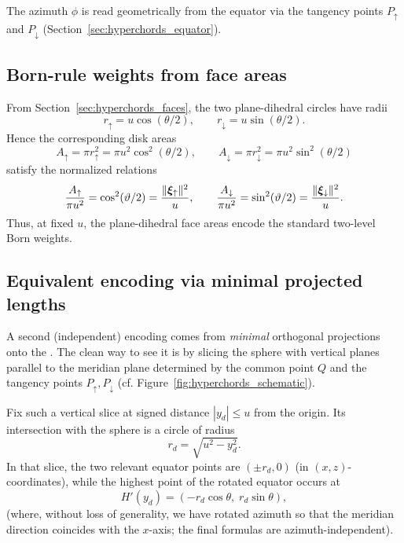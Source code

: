 The azimuth \(\phi\) is read geometrically from the equator via the tangency points \(P_\uparrow\) and \(P_\downarrow\) (Section~\ref{sec:hyperchords_equator}).

\subsection{Born-rule weights from face areas}
\label{sec:reading_probabilities}

From Section~\ref{sec:hyperchords_faces}, the two plane-dihedral circles have radii
\[
r_\uparrow=u\cos(\theta/2),
\qquad
r_\downarrow=u\sin(\theta/2).
\]
Hence the corresponding disk areas
\[
A_\uparrow=\pi r_\uparrow^2=\pi u^2\cos^2(\theta/2),
\qquad
A_\downarrow=\pi r_\downarrow^2=\pi u^2\sin^2(\theta/2)
\]
satisfy the normalized relations
\begin{equation}
\label{eq:born_areas}
\frac{A_\uparrow}{\pi u^2}=\cos^2(\vartheta/2)=\frac{\|\bm{\xi}_\uparrow\|^2}{u},
\qquad
\frac{A_\downarrow}{\pi u^2}=\sin^2(\vartheta/2)=\frac{\|\bm{\xi}_\downarrow\|^2}{u}.
\end{equation}
Thus, at fixed \(u\), the plane-dihedral face areas encode the standard two-level Born weights.

\subsection{Equivalent encoding via minimal projected lengths}
\label{sec:born_projected_lengths}

A second (independent) encoding comes from \emph{minimal} orthogonal projections onto the \xyplane.
The clean way to see it is by slicing the sphere with vertical planes parallel to the meridian plane determined by the common point \(Q\) and the tangency points \(P_\uparrow,P_\downarrow\) (cf. Figure~\ref{fig:hyperchords_schematic}).

Fix such a vertical slice at signed distance \(|y_d|\le u\) from the origin.
Its intersection with the sphere is a circle of radius
\[
r_d=\sqrt{u^2-y_d^2}.
\]
In that slice, the two relevant equator points are \((\pm r_d,0)\) (in \((x,z)\)-coordinates), while the highest point of the rotated equator occurs at
\[
H'(y_d)=(-r_d\cos\theta,\; r_d\sin\theta),
\]
(where, without loss of generality, we have rotated azimuth so that the meridian direction coincides with the \(x\)-axis; the final formulas are azimuth-independent).

